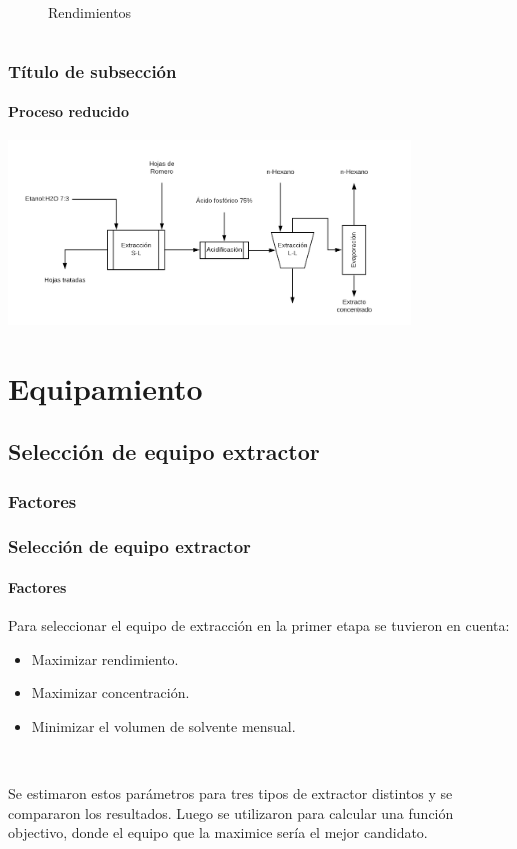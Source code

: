 \documentclass[aspectratio=1610]{beamer}
\newcommand{\titleframe}[1]{
\begin{frame} \null\hfill\huge{\shadowbox{#1}}\hspace{1cm} \end{frame}}
\newcommand{\ssec}{Título de subsección}
\begin{document}
\begin{frame}
\begin{columns}
\begin{center}
\begin{figure}
	\caption{Rendimientos}
	\end{figure}
	\end{center}
	\end{columns}
\end{frame}

\begin{frame}
	\frametitle{\ssec}
	\framesubtitle{Proceso reducido}
	\begin{center}
	\includegraphics[width=0.8\textwidth]{figs/purificacion-proceso-final.png}
	\end{center}
\end{frame}


\section{Equipamiento}

\titleframe{Equipamiento}

\renewcommand{\ssec}{Selección de equipo extractor}
\subsection{\ssec}
\subsubsection{Factores}
\begin{frame}[c]
	\frametitle{\ssec}
	\framesubtitle{Factores}
	Para seleccionar el equipo de extracción en la primer etapa se tuvieron
	en cuenta:
	\begin{itemize}
	\item Maximizar rendimiento.
	\item Maximizar concentración.
	\item Minimizar el volumen de solvente mensual.
	\end{itemize}
	
	~

	Se estimaron estos parámetros para tres tipos de 
	extractor distintos y se compararon los resultados.
	Luego se utilizaron para calcular una función objectivo, 
	donde el equipo que la maximice sería el mejor candidato.

\end{frame}
\end{document}
